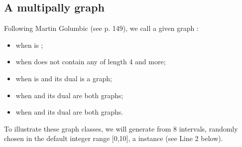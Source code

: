 \documentclass[a4paper,10pt,english]{sphinxhowto}
\begin{document}
\subsection{A multipally  graph}
\label{\detokenize{tutorial:a-multipally-perfect-graph}}
Following Martin Golumbic (see  p. 149), we call a given graph :
\begin{itemize}
\item {} 
 when   is ;

\item {} 
 when  does not contain any  of length 4 and more;

\item {} 
 when  is  and its dual  is a  graph;

\item {} 
 when  and its dual  are both  graphs;

\item {} 
 when  and its dual  are both  graphs.

\end{itemize}

To illustrate these  graph classes, we will generate from 8 intervals, randomly chosen in the default integer range {[}0,10{]}, a  instance  (see Line 2 below).
\end{document}
